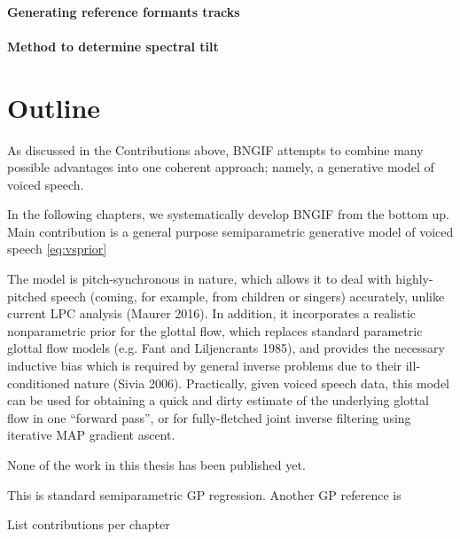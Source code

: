 \begin{chaptersections}
\paragraph{Generating reference formants tracks}

\paragraph{Method to determine spectral tilt}

\section{Outline}

As discussed in the Contributions above, BNGIF attempts to combine many possible advantages into one coherent approach; namely, a generative model of voiced speech.

In the following chapters, we systematically develop BNGIF from the bottom up.
Main contribution is a general purpose semiparametric generative model of voiced speech \eqref{eq:vsprior}

The model is pitch-synchronous in nature, which
allows it to deal with highly-pitched speech (coming, for example, from children or singers) accurately,
unlike current LPC analysis (Maurer 2016). In addition, it incorporates a realistic nonparametric prior
for the glottal flow, which replaces standard parametric glottal flow models (e.g. Fant and Liljencrants
1985), and provides the necessary inductive bias which is required by general inverse problems due to
their ill-conditioned nature (Sivia 2006). Practically, given voiced speech data, this model can be used
for obtaining a quick and dirty estimate of the underlying glottal flow in one “forward pass”, or for
fully-fletched joint inverse filtering using iterative MAP gradient ascent.

None of the work in this thesis has been published yet.

This is standard semiparametric GP regression.
Another GP reference is \citep{MacKay1998}

List contributions per chapter

\end{chaptersections}

